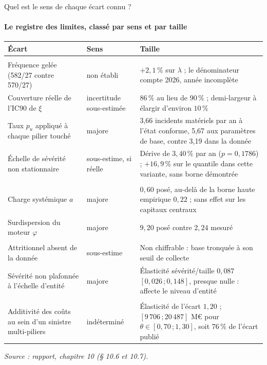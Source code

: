 \documentclass[aspectratio=169,10pt,t]{beamer}
\newcommand{\source}[1]{\par\vfill{\tiny\color{gris}\textit{Source : #1}}\par\vspace{-1mm}}
\renewcommand{\arraystretch}{1.25}
\begin{document}
\begin{frame}{Quel est le sens de chaque écart connu ?}
  \suivimethode{}{}
  \framesubtitle{\ajout Le registre des limites, classé par sens et par taille}
  \scriptsize
  \renewcommand{\arraystretch}{1.0}
  \begin{tabularx}{\linewidth}{@{}>{\raggedright\arraybackslash}p{.30\linewidth} >{\raggedright\arraybackslash}p{.14\linewidth} Y@{}}
    \toprule
    Écart & Sens & Taille \\
    \midrule
     \\
    Fréquence gelée (582/27 contre 570/27) & non établi & $+2{,}1\,\%$ sur $\lambda$ ; le dénominateur compte 2026, année incomplète \\
    Couverture réelle de l'IC90 de $\xi$ & incertitude sous-estimée & $86\,\%$ au lieu de $90\,\%$ ; demi-largeur à élargir d'environ $10\,\%$ \\
    Taux $p_u$ appliqué à chaque pilier touché & majore & 3,66 incidents matériels par an à l'état conforme, 5,67 aux paramètres de base, contre 3,19 dans la donnée \\
    Échelle de sévérité non stationnaire & sous-estime, si réelle & Dérive de $3{,}40\,\%$ par an ($p=0{,}1786$) ; $+16{,}9\,\%$ sur le quantile dans cette variante, sans borne démontrée \\
     \\
    Charge systémique $a$ & majore & $0{,}60$ posé, au-delà de la borne haute empirique $0{,}22$ ; sans effet sur les capitaux centraux \\
    Surdispersion du moteur $\varphi$ & majore & $9{,}20$ posé contre $2{,}24$ mesuré \\
     \\
    Attritionnel absent de la donnée & sous-estime & Non chiffrable : base tronquée à son seuil de collecte \\
    Sévérité non plafonnée à l'échelle d'entité & majore & Élasticité sévérité/taille $0{,}087$ $[0{,}026\,;0{,}148]$, presque nulle : affecte le niveau d'entité \\
     \\
    Additivité des coûts au sein d'un sinistre multi-piliers & indéterminé & Élasticité de l'écart $1{,}20$ ; $[9\,706\,;20\,487]$ M€ pour $\theta\in[0{,}70\,;1{,}30]$, soit 76\,\% de l'écart publié \\
    \bottomrule
  \end{tabularx}
  \source{rapport, chapitre 10 (§ 10.6 et 10.7).}
\end{frame}
\end{document}
